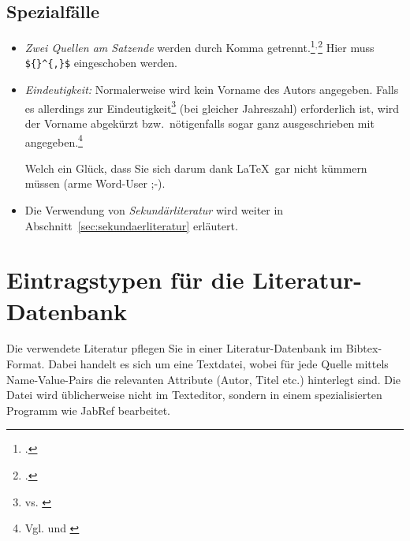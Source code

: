 \subsection{Spezialfälle}
\begin{itemize}
\item \emph{Zwei Quellen am Satzende} werden durch Komma getrennt.\footcite{Staab}${}^{,}$\footcite{mayerLukas:PA1} Hier muss \verb|${}^{,}$| eingeschoben werden.
\item \emph{Eindeutigkeit:} Normalerweise wird kein Vorname des Autors angegeben. Falls es allerdings zur Eindeutigkeit\footnote{\cite{trautwein2011unternehmensplanspiele} vs. \cite{hitzler2011optimierung}} (bei gleicher Jahreszahl) erforderlich ist, wird der Vorname abgekürzt bzw.\ nötigenfalls sogar ganz ausgeschrieben mit angegeben.\footnote{Vgl. \cite{mayer:PA1} und \cite{mayerLukas:PA1}}
 
Welch ein Glück, dass Sie sich darum dank \LaTeX\ gar nicht kümmern müssen (arme Word\texttrademark-User ;-).

\item Die Verwendung von \emph{Sekundärliteratur} wird weiter in Abschnitt~\ref{sec:sekundaerliteratur} erläutert.
\end{itemize}


\section{Eintragstypen für die Literatur-Datenbank}

Die verwendete Literatur pflegen Sie in einer Literatur-Datenbank im Bibtex-Format. Dabei handelt es sich um eine Textdatei, wobei für jede Quelle mittels Name-Value-Pairs die relevanten Attribute (Autor, Titel etc.) hinterlegt sind. Die Datei wird üblicherweise nicht im Texteditor, sondern in einem spezialisierten Programm wie JabRef bearbeitet.

